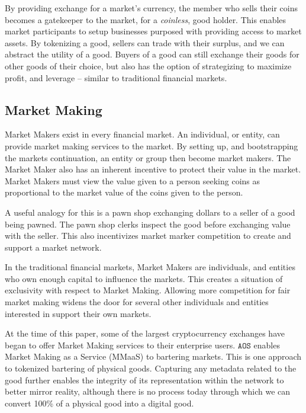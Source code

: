 \documentclass[10pt, titlepage, twocolumn]{report}
\begin{document}
\hspace*{15pt}
By providing exchange for a market's currency, the member who sells their coins becomes a gatekeeper to the market, for a \textit{coinless}, good holder. This enables market participants to setup businesses purposed with providing access to market assets. By tokenizing a good, sellers can trade with their surplus, and we can abstract the utility of a good. Buyers of a good can still exchange their goods for other goods of their choice, but also has the option of strategizing to maximize profit, and leverage -- similar to traditional financial markets.

\subsection{Market Making}
\hspace*{15pt}
Market Makers exist in every financial market. An individual, or entity, can provide market making services to the market. By setting up, and bootstrapping the markets continuation, an entity or group then become market makers. The Market Maker also has an inherent incentive to protect their value in the market. Market Makers must view the value given to a person seeking coins as proportional to the market value of the coins given to the person. 

\hspace*{15pt}
A useful analogy for this is a pawn shop exchanging dollars to a seller of a good being pawned. The pawn shop clerks inspect the good before exchanging value with the seller. This also incentivizes market marker competition to create and support a market network. 

\hspace*{15pt}
In the traditional financial markets, Market Makers are individuals, and entities who own enough capital to influence the markets. This creates a situation of exclusivity with respect to Market Making. Allowing more competition for fair market making widens the door for several other individuals and entities interested in support their own markets. 

\hspace*{15pt}
At the time of this paper, some of the largest cryptocurrency exchanges have began to offer Market Making services to their enterprise users. \(\texttt{AOS}\) enables Market Making as a Service (MMaaS) to bartering markets. This is one approach to tokenized bartering of physical goods. Capturing any metadata related to the good further enables the integrity of its representation within the network to better mirror reality, although there is no process today through which we can convert 100\% of a physical good into a digital good. 
\end{document}
